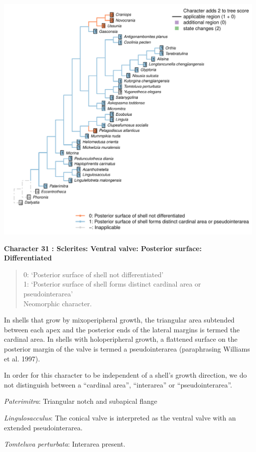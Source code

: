 \documentclass[]{book}
\theoremstyle{definition}
\theoremstyle{definition}
\theoremstyle{definition}
\theoremstyle{remark}
\begin{document}
\includegraphics{Brachiopod_phylogeny_files/figure-latex/unnamed-chunk-5-31.pdf}

\textbf{Character 31 : Sclerites: Ventral valve: Posterior surface:
Differentiated }

\begin{quote}
0: `Posterior surface of shell not differentiated'\\
1: `Posterior surface of shell forms distinct cardinal area or
pseudointerarea'\\
Neomorphic character.
\end{quote}

In shells that grow by mixoperipheral growth, the triangular area
subtended between each apex and the posterior ends of the lateral
margins is termed the cardinal area. In shells with holoperipheral
growth, a flattened surface on the posterior margin of the valve is
termed a pseudointerarea (paraphrasing Williams et al. 1997).

In order for this character to be independent of a shell's growth
direction, we do not distinguish between a ``cardinal area'',
``interarea'' or ``pseudointerarea''.

\emph{Paterimitra}: Triangular notch and subapical flange

\emph{Lingulosacculus}: The conical valve is interpreted as the ventral
valve with an extended pseudointerarea.

\emph{Tomteluva perturbata}: Interarea present.
\end{document}
